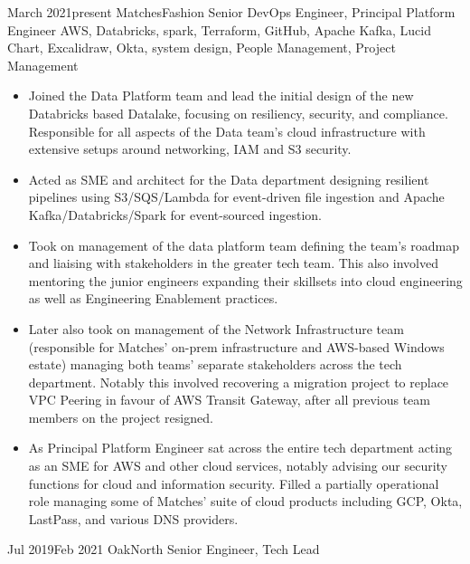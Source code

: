 \documentclass[10pt]{article} %
\begin{document}
\jobheader
{March 2021}{present}
{MatchesFashion}
{Senior DevOps Engineer, Principal Platform Engineer}
{
      AWS, Databricks, spark, Terraform, GitHub, Apache Kafka, Lucid Chart, Excalidraw,
      Okta, system design, People Management, Project Management
}
{
  \begin{itemize}

      \item Joined the Data Platform team and lead the initial design of the new Databricks based
            Datalake, focusing on resiliency, security, and compliance. Responsible for all aspects
            of the Data team's cloud infrastructure with extensive setups around networking, IAM
            and S3 security.

      \item Acted as SME and architect for the Data department designing resilient pipelines
            using S3/SQS/Lambda for event-driven file ingestion
            and Apache Kafka/Databricks/Spark for event-sourced ingestion.

      \item Took on management of the data platform team defining the team's roadmap and liaising
            with stakeholders in the greater tech team. This also involved mentoring the junior
            engineers expanding their skillsets into cloud engineering as well as Engineering
            Enablement practices.

      \item Later also took on management of the Network Infrastructure team (responsible for Matches'
            on-prem infrastructure and AWS-based Windows estate) managing both teams' separate stakeholders
            across the tech department.
            Notably this involved recovering a migration project to replace VPC Peering in favour of
            AWS Transit Gateway, after all previous team members on the project resigned.

      \item As Principal Platform Engineer sat across the entire tech department acting as an
            SME for AWS and other cloud services, notably advising our security functions for cloud
            and information security. Filled a partially operational role managing some of Matches'
            suite of cloud products including GCP, Okta, LastPass, and various DNS providers.

  \end{itemize}
}
\jobheader
{Jul 2019}{Feb 2021}
{OakNorth}
{Senior Engineer, Tech Lead}
\end{document}
